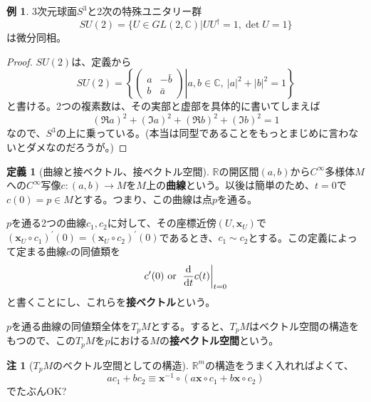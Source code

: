 \documentclass[unicode,a4paper,11pt]{ltjsarticle}
\theoremstyle{definition}
\newtheorem{dfn}{定義}[section]
\newtheorem{exm}{例}[section]
\newtheorem{rmk}{注}[section]
\begin{document}
\begin{exm}
  3次元球面$S^{3}$と2次の特殊ユニタリー群
  \begin{equation}
    SU(2)
    =
    \{U\in GL(2,\mathbb{C})|UU^{\dag}=1,\det U=1\}
  \end{equation}
  は微分同相。
  \begin{proof}
    \label{prf:eg_s3_unitary}
    $SU(2)$は、定義から
    \begin{equation}
      SU(2)
      =
      \left\{
      \left.
      \begin{pmatrix}
        a & -\bar{b} \\
        b & \bar{a}
      \end{pmatrix}
      \right|
      a,b\in \mathbb{C}
      ,\
      |a|^2+|b|^2
      =
      1
      \right\}
    \end{equation}
    と書ける。2つの複素数は、その実部と虚部を具体的に書いてしまえば
    \begin{equation}
      (\Re a)^2
      +
      (\Im a)^2
      +
      (\Re b)^2
      +
      (\Im b)^2
      =
      1
    \end{equation}
    なので、$S^{3}$の上に乗っている。(本当は同型であることをもっとまじめに言わないとダメなのだろうが。)
  \end{proof}
\end{exm}

\begin{dfn}[曲線と接ベクトル、接ベクトル空間]
  $\mathbb{R}$の開区間$(a,b)$から$C^{\infty}$多様体$M$への$C^{\infty}$写像$c:(a,b)\rightarrow M$を$M$上の\textbf{曲線}という。以後は簡単のため、$t=0$で$c(0)=p\in M$とする。つまり、この曲線は点$p$を通る。

  $p$を通る2つの曲線$c_{1},c_{2}$に対して、その座標近傍$(U,\bm{x}_{U})$で$(\bm{x}_{U}\circ c_{1})^{\prime}(0)=(\bm{x}_{U}\circ c_{2})^{\prime}(0)$であるとき、$c_{1}\sim c_{2}$とする。この定義によって定まる曲線$c$の同値類を
  \begin{equation}
    c'(0)
    \mathrm{\ or\ }
    \left.\dv{}{t}c(t)\right|_{t=0}
  \end{equation}
  と書くことにし、これらを\textbf{接ベクトル}という。

  $p$を通る曲線の同値類全体を$T_{p}M$とする。すると、$T_{p}M$はベクトル空間の構造をもつので、この$T_{p}M$を$p$における$M$の\textbf{接ベクトル空間}という。
\end{dfn}

\begin{rmk}[$T_{p}M$のベクトル空間としての構造]
  \label{rmk:vector_str_TpM}
  $\mathbb{R}^{m}$の構造をうまく入れればよくて、
  \begin{equation}
    ac_{1}+bc_{2}
    \equiv
    \bm{x}^{-1}\circ(a\bm{x}\circ c_{1}+b\bm{x}\circ c_{2})
  \end{equation}
  でたぶんOK?
\end{rmk}
\end{document}
